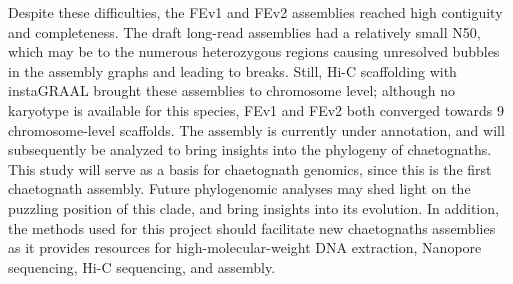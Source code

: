 Despite these difficulties, the FEv1 and FEv2 assemblies reached high contiguity and completeness. The draft long-read assemblies had a relatively small N50, which may be to the numerous heterozygous regions causing unresolved bubbles in the assembly graphs and leading to breaks. Still, Hi-C scaffolding with instaGRAAL brought these assemblies to chromosome level; although no karyotype is available for this species, FEv1 and FEv2 both converged towards 9 chromosome-level scaffolds. The assembly is currently under annotation, and will subsequently be analyzed to bring insights into the phylogeny of chaetognaths. \\

This study will serve as a basis for chaetognath genomics, since this is the first chaetognath assembly. Future phylogenomic analyses may shed light on the puzzling position of this clade, and bring insights into its evolution. In addition, the methods used for this project should facilitate new chaetognaths assemblies as it provides resources for high-molecular-weight DNA extraction, Nanopore sequencing, Hi-C sequencing, and assembly.